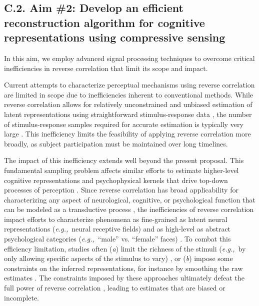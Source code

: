 \documentclass[11pt, notitlepage]{article} %
\def\eg{{\emph{e.g.,}}~}
\begin{document}
\subsection*{C.2. Aim \#2: Develop an efficient reconstruction algorithm for cognitive representations using compressive sensing}

In this aim, we employ advanced signal processing techniques to overcome critical inefficiencies
in reverse correlation that limit its scope and impact.

Current attempts to characterize perceptual mechanisms using reverse correlation
are limited in scope due to inefficiencies inherent to conventional methods.
While reverse correlation allows for relatively unconstrained and unbiased
estimation of latent representations using straightforward stimulus-response data
\cite{marmarelisWhiteNoiseMethodSystem1978,nishimotoReceptiveFieldProperties2006},
the number of stimulus-response samples required for accurate estimation
is typically very large \cite{mineaultImprovedClassificationImages2009}.
This inefficiency limits the feasibility of applying reverse correlation more broadly,
as subject participation must be maintained over long timelines.

The impact of this inefficiency extends well beyond the present proposal.
This fundamental sampling problem affects similar efforts to estimate higher-level
cognitive representations and psychophysical kernels that drive top-down processes of perception
\cite{ahumadaStimulusFeaturesSignal1971,neriReceptivePerceptiveFields2006,gosselinSuperstitiousPerceptionsReveal2003,smithMeasuringInternalRepresentations2012}.
Since reverse correlation has broad applicability for characterizing any aspect
of neurological, cognitive, or psychological function that can be modeled as a transductive process
\cite{ringachReverseCorrelationNeurophysiology2004},
the inefficiencies of reverse correlation impact efforts
to characterize phenomena as fine-grained as latent neural representations (\eg neural receptive fields) \cite{ringachReverseCorrelationNeurophysiology2004}
and as high-level  as abstract psychological categories (\eg ``male'' vs. ``female'' faces)
\cite{brinkmanVisualisingMentalRepresentations2017,ponsotCrackingSocialCode2018,manginiMakingIneffableExplicit2004}.
To combat this efficiency limitation, studies often 
(\emph{a}) limit the richness of the stimuli (\eg by only allowing specific aspects of the stimulus to vary)
\cite{gosselinBubblesTechniqueReveal2001},
or (\emph{b}) impose some constraints on the inferred representations,
for instance by smoothing the raw estimates \cite{gosselinSuperstitiousPerceptionsReveal2003}.
The constraints imposed by these approaches ultimately defeat the full power of reverse correlation
\cite{murrayTroublesBubbles2004},
leading to estimates that are biased or incomplete.
\end{document}
